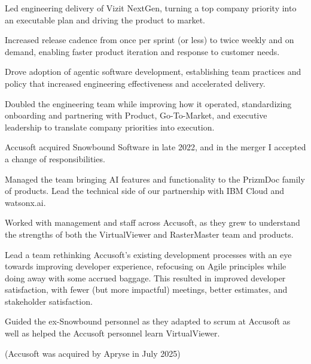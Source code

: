 \documentclass[letterpaper,10pt]{article}
\begin{document}
  \begin{resume_list}
    \item Led engineering delivery of Vizit NextGen, turning a top company
        priority into an executable plan and driving the product to market.
    \item Increased release cadence from once per sprint (or less) to twice
        weekly and on demand, enabling faster product iteration and response
        to customer needs.
    \item Drove adoption of agentic software development, establishing team
        practices and policy that increased engineering effectiveness and
        accelerated delivery.
    \item Doubled the engineering team while improving how it operated,
        standardizing onboarding and partnering with Product, Go-To-Market,
        and executive leadership to translate company priorities into
        execution.
  \end{resume_list}

  \begin{resume_list}
    \item Accusoft acquired Snowbound Software in late 2022, and in the
        merger I accepted a change of responsibilities.
    \item Managed the team bringing AI features and functionality to the
        PrizmDoc family of products. Lead the technical side of our
        partnership with IBM Cloud and watsonx.ai.
    \item Worked with management and staff across Accusoft, as they grew to
        understand the strengths of both the VirtualViewer and RasterMaster
        team and products.
    \item Lead a team rethinking Accusoft's existing development processes
        with an eye towards improving developer experience, refocusing on
        Agile principles while doing away with some accrued baggage. This
        resulted in improved developer satisfaction, with fewer (but more
        impactful) meetings, better estimates, and stakeholder satisfaction.
    \item Guided the ex-Snowbound personnel as they adapted to scrum at
        Accusoft as well as helped the Accusoft personnel learn
        VirtualViewer.
    \item (Accusoft was acquired by Apryse in July 2025)
  \end{resume_list}
\end{document}
